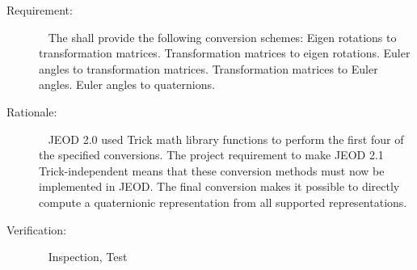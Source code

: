 \label{reqt:conversions}
\begin{description}
\item[Requirement:]\ \newline
  The \ModelDesc shall provide the following conversion schemes:
  \subrequirement{}\label{reqt:eigen_to_mat}
  Eigen rotations to transformation matrices.
  \subrequirement{}\label{reqt:mat_to_eigen}
  Transformation matrices to eigen rotations.
  \subrequirement{}\label{reqt:euler_to_mat}
  Euler angles to transformation matrices.
  \subrequirement{}\label{reqt:mat_to_euler}
  Transformation matrices to Euler angles.
  \subrequirement{}\label{reqt:euler_to_quat}
  Euler angles to quaternions.
\item[Rationale:]\ \newline
  JEOD 2.0 used Trick math library functions to perform the first four
  of the specified conversions. The project requirement to make JEOD 2.1
  Trick-independent means that these conversion methods must now be implemented
  in JEOD. The final conversion makes it possible to directly compute a
  quaternionic representation from all supported representations.
  
\item[Verification:]\ \newline
  Inspection, Test
\end{description}
